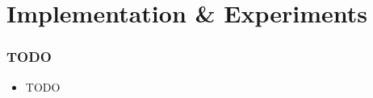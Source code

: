 \section{Implementation \& Experiments}
    \begin{frame}[t]
        \frametitle{TODO}
        
        \vspace{-0.5em}
        \begin{itemize}
            \item TODO
        \end{itemize}

        \onslide %
    \end{frame}
